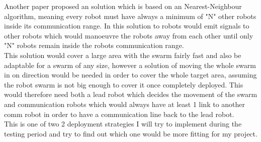 \documentclass[10pt,a4paper]{article}
\begin{document}
\begin{flushleft}
Another paper proposed an solution which is based on an Nearest-Neighbour algorithm, meaning every robot must have always a minimum of "N" other robots inside its communication range\cite{Poduri2004Constrained}. In this solution to robots would emit signals to other robots which would manoeuvre the robots away from each other until only "N" robots remain inside the robots communication range. \\
This solution would cover a large area with the swarm fairly fast and also be adaptable for a swarm of any size, however a solution of moving the whole swarm in on direction would be needed in order to cover the whole target area, assuming the robot swarm is not big enough to cover it once completely deployed.
This would therefore need both a lead robot which decides the movement of the swarm and communication robots which would always have at least 1 link to another comm robot in order to have a communication line back to the lead robot. \\
This is one of two 2 deployment strategies I will try to implement during the testing period and try to find out which one would be more fitting for my project.\\[3ex]

\nocite{*}
\newpage

\end{flushleft}
\end{document}
